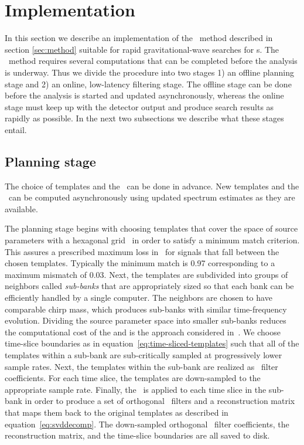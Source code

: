 \section{Implementation}
\label{sec:implementation}

In this section we describe an implementation of the \lloid\ method described
in section \ref{sec:method} suitable for rapid gravitational-wave
searches for \CBC{}s.  The \lloid\ method requires several
computations that can be completed before the analysis is underway.  Thus
we divide the procedure into two stages 1) an offline planning stage and 2) an
online, low-latency filtering stage.  The offline stage can be done before the
analysis is started and updated asynchronously, whereas the online stage must
keep up with the detector output and produce search results as rapidly as
possible.  In the next two subsections we describe what these stages entail.

\subsection{Planning stage}

The choice of templates and the \SVD\ can be done in advance.  New templates
and the \SVD\ can be computed asynchronously using updated spectrum estimates
as they are available. 


The planning stage begins with choosing templates that cover the space of
source parameters with a hexagonal grid~\cite{PhysRevD.76.102004} in order to
satisfy a minimum match criterion.  This assures a prescribed maximum loss in
\SNR\ for signals that fall between the chosen templates.  Typically the
minimum match is 0.97 corresponding to a maximum mismatch of 0.03.  Next, the
templates are subdivided into groups of neighbors called \emph{sub-banks} that
are appropriately sized so that each bank can be efficiently handled by a
single computer.  The neighbors are chosen to have comparable chirp mass, which
produces sub-banks with similar time-frequency evolution.  Dividing the source
parameter space into smaller sub-banks reduces the computational cost of the
\SVD{} and is the approach considered
in~\cite{Cannon:2010p10398}.  We choose time-slice boundaries as in
equation~\eqref{eq:time-sliced-templates} such that all of the templates within
a sub-bank are sub-critically sampled at progressively lower sample rates.
Next, the templates within the sub-bank are realized as \fir\ filter
coefficients.  For each time slice, the templates are down-sampled to the
appropriate sample rate.  Finally, the \SVD\ is applied to each time slice in
the sub-bank in order to produce a set of orthogonal \fir\ filters and a
reconstruction matrix that maps them back to the original templates as
described in equation~\eqref{eq:svddecomp}.  The down-sampled orthogonal \fir\
filter coefficients, the reconstruction matrix, and the time-slice boundaries
are all saved to disk.

